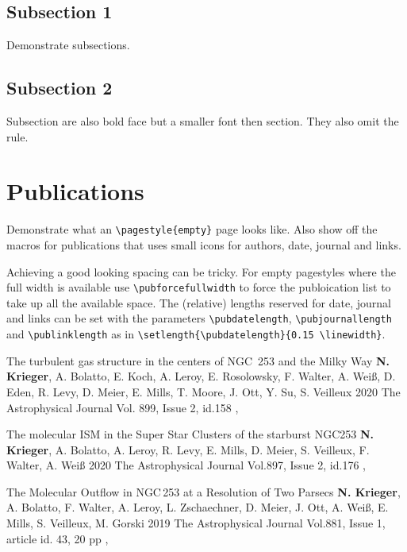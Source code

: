 \documentclass[%
               doublesided,
               paper=a4,
               fontsize=10pt
              ]{my-resume}
\begin{document}
{    \vspace{0.5em}
    \subsection{Subsection 1}
    Demonstrate subsections.
    
    \subsection{Subsection 2}
    Subsection are also bold face but a smaller font then section. They also omit the rule.
    

}
\makebody


\clearpage
\pagestyle{empty}

\section{Publications}
\pubforcefullwidth

Demonstrate what an \texttt{\textbackslash pagestyle\{empty\}} page looks like.
Also show off the macros for publications that uses small icons for authors, date, journal and links.

Achieving a good looking spacing can be tricky. For empty pagestyles where the full width is available use \texttt{\textbackslash pubforcefullwidth} to force the publoication list to take up all the available space.
The (relative) lengths reserved for date, journal and links can be set with the parameters \texttt{\textbackslash pubdatelength}, \texttt{\textbackslash pubjournallength} and \texttt{\textbackslash publinklength} as in \texttt{\textbackslash setlength\{\textbackslash pubdatelength\}\{0.15 \textbackslash linewidth\}}.
\bigskip

\publication
	{The turbulent gas structure in the centers of NGC~253 and the Milky Way} %
	{\textbf{N. Krieger}, A. Bolatto, E. Koch, A. Leroy, E. Rosolowsky, F. Walter, A. Wei\ss, D. Eden, R. Levy, D. Meier, E. Mills, T. Moore, J. Ott, Y. Su, S. Veilleux} %
	{2020} %
	{The Astrophysical Journal Vol. 899, Issue 2, id.158} %
	{, } %

\publication
	{The molecular ISM in the Super Star Clusters of the starburst NGC253} %
	{\textbf{N. Krieger}, A. Bolatto, A. Leroy, R. Levy, E. Mills, D. Meier, S. Veilleux, F. Walter, A. Wei\ss} %
	{2020} %
	{The Astrophysical Journal Vol.897, Issue 2, id.176} %
	{, } %

\publication
	{The Molecular Outflow in NGC\,253 at a Resolution of Two Parsecs} %
	{\textbf{N. Krieger}, A. Bolatto, F. Walter, A. Leroy, L. Zschaechner, D. Meier, J. Ott, A. Wei\ss, E. Mills, S. Veilleux, M. Gorski} %
	{2019} %
	{The Astrophysical Journal Vol.881, Issue 1, article id. 43, 20 pp} %
	{, } %
\end{document}
